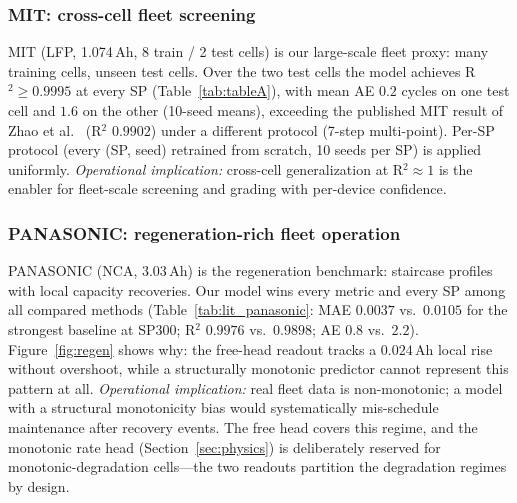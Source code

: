 \subsubsection{MIT: cross-cell fleet screening}
MIT (LFP, 1.074\,Ah, 8 train / 2 test cells) is our large-scale
fleet proxy: many training cells, unseen test cells. Over the two
test cells the model achieves R$^2 \ge 0.9995$ at every SP
(Table~\ref{tab:tableA}), with mean AE $0.2$ cycles on one test cell
and $1.6$ on the other (10-seed means), exceeding the published MIT
result of Zhao et al.\ \cite{ref_zhou2025}
(R$^2$ $0.9902$) under a different protocol (7-step multi-point).
Per-SP protocol (every (SP, seed) retrained from scratch, 10 seeds
per SP) is applied uniformly. \emph{Operational implication:}
cross-cell generalization at R$^2 \approx 1$ is the enabler for
fleet-scale screening and grading with per-device confidence.

\subsubsection{PANASONIC: regeneration-rich fleet operation}
PANASONIC (NCA, 3.03\,Ah) is the regeneration benchmark: staircase
profiles with local capacity recoveries. Our model wins every metric
and every SP among all compared methods (Table~\ref{tab:lit_panasonic}:
MAE $0.0037$ vs.\ $0.0105$ for the strongest baseline at SP300; R$^2$
$0.9976$ vs.\ $0.9898$; AE $0.8$ vs.\ $2.2$). Figure~\ref{fig:regen}
shows why: the free-head readout tracks a $0.024$\,Ah local rise
without overshoot, while a structurally monotonic predictor cannot
represent this pattern at all. \emph{Operational implication:} real
fleet data is non-monotonic; a model with a structural monotonicity
bias would systematically mis-schedule maintenance after recovery
events. The free head covers this regime, and the monotonic rate head
(Section~\ref{sec:physics}) is deliberately reserved for
monotonic-degradation cells---the two readouts partition the
degradation regimes by design.

